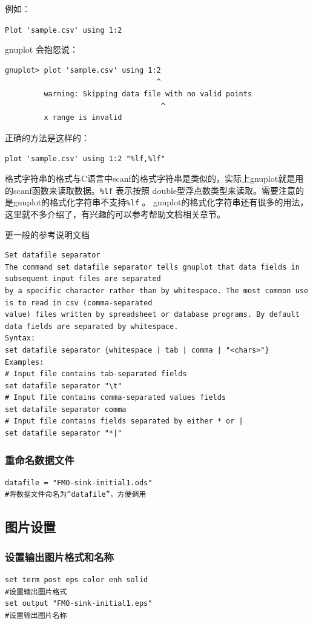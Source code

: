 例如：

\verb*|Plot 'sample.csv' using 1:2|

gnuplot 会抱怨说：
\begin{verbatim}
gnuplot> plot 'sample.csv' using 1:2
                                   ^
         warning: Skipping data file with no valid points
                                    ^
         x range is invalid
\end{verbatim}

正确的方法是这样的：

\verb*|plot 'sample.csv' using 1:2 "%lf,%lf"|

格式字符串的格式与C语言中scanf的格式字符串是类似的，实际上gnuplot就是用的scanf函数来读取数据。\verb|%lf| 
表示按照 double型浮点数类型来读取。需要注意的是gnuplot的格式化字符串不支持\verb|%lf| 。
gnuplot的格式化字符串还有很多的用法，这里就不多介绍了，有兴趣的可以参考帮助文档相关章节。

更一般的参考说明文档
\begin{verbatim}
Set datafile separator
The command set datafile separator tells gnuplot that data fields in subsequent input files are separated
by a specific character rather than by whitespace. The most common use is to read in csv (comma-separated
value) files written by spreadsheet or database programs. By default data fields are separated by whitespace.
Syntax:
set datafile separator {whitespace | tab | comma | "<chars>"}
Examples:
# Input file contains tab-separated fields
set datafile separator "\t"
# Input file contains comma-separated values fields
set datafile separator comma
# Input file contains fields separated by either * or |
set datafile separator "*|"
\end{verbatim}


\subsubsection{重命名数据文件}
\begin{verbatim}
datafile = "FMO-sink-initial1.ods"
#将数据文件命名为“datafile”，方便调用
\end{verbatim}



\subsection{图片设置}
\subsubsection{设置输出图片格式和名称}
\begin{verbatim}
set term post eps color enh solid
#设置输出图片格式
set output "FMO-sink-initial1.eps"
#设置输出图片名称
\end{verbatim}

